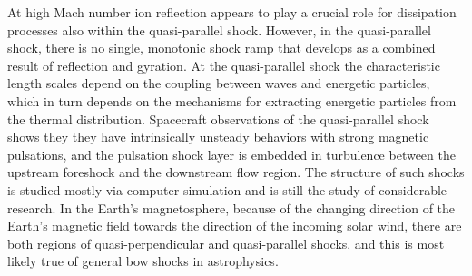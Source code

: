 \documentclass[12pt,a4paper]{article}
\begin{document}
At high Mach number ion reflection appears to play a crucial role for dissipation processes also within the quasi-parallel shock. However, in the quasi-parallel shock, there is no single, monotonic shock ramp that develops as a combined result of reflection and gyration. At the quasi-parallel shock the characteristic length scales depend on the coupling between waves and energetic particles, which in turn depends on the mechanisms for extracting energetic particles from the thermal distribution. Spacecraft observations of the quasi-parallel shock shows they they have intrinsically unsteady behaviors with strong magnetic pulsations, and the pulsation shock layer is embedded in turbulence between the upstream foreshock and the downstream flow region. The structure of such shocks is studied mostly via computer simulation and is still the study of considerable research. In the Earth's magnetosphere, because of the changing direction of the Earth’s magnetic field towards the direction of the incoming solar wind, there are both regions of quasi-perpendicular and quasi-parallel shocks, and this is most likely true of general bow shocks in astrophysics.

\cite{1997aspp.book.....T}








\end{document}
